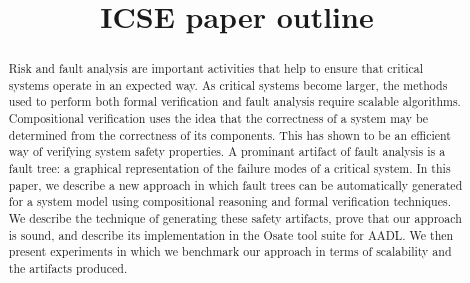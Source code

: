 \documentclass[10pt,conference]{IEEEtran}
\begin{document}
\newcommand{\stateequiv}{\equiv_{s}}
\newcommand{\traceequiv}{\equiv_{\sigma}}
\newcommand{\ta}{\text{TA}}
\newcommand{\cta}{\text{TA$_{C}$}}
\newcommand{\tta}{\text{TA$_{T}$}}
\newcommand{\ucalg}{\texttt{\small{IVC\_UC}}}
\newcommand{\ucbfalg}{\texttt{\small{IVC\_UCBF}}}


\title{ICSE paper outline}
%


\author{
\and
{}
\and
{}
\and
{}
\and
{}
\and
{}
}

\maketitle

\begin{abstract}
Risk and fault analysis are important activities that help to ensure that critical systems operate in an expected way. As critical systems become larger, the methods used to perform both formal verification and fault analysis require scalable algorithms. Compositional verification uses the idea that the correctness of a system may be determined from the correctness of its components. This has shown to be an efficient way of verifying system safety properties. A prominant artifact of fault analysis is a fault tree: a graphical representation of the failure modes of a critical system. In this paper, we describe a new approach in which fault trees can be automatically generated for a system model using compositional reasoning and formal verification techniques. We describe the technique of generating these safety artifacts, prove that our approach is sound, and describe its implementation in the Osate tool suite for AADL. We then present experiments in which we benchmark our approach in terms of scalability and the artifacts produced. 
\end{abstract}
\end{document}
